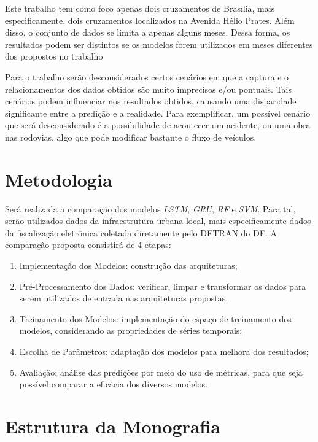 Este trabalho tem como foco apenas dois cruzamentos de Brasília, mais especificamente, dois cruzamentos localizados na Avenida Hélio Prates. Além disso, o conjunto de dados se limita a apenas alguns meses. Dessa forma, os resultados podem ser distintos se os modelos forem utilizados em meses diferentes dos propostos no trabalho

Para o trabalho serão desconsiderados certos cenários em que a captura e o relacionamentos dos dados obtidos são muito imprecisos e/ou pontuais. Tais cenários podem influenciar nos resultados obtidos, causando uma disparidade significante entre a predição e a realidade. Para exemplificar, um possível cenário que será desconsiderado é a possibilidade de acontecer um acidente, ou uma obra nas rodovias, algo que pode modificar bastante o fluxo de veículos.

\section{Metodologia}

Será realizada a comparação dos modelos  \textit{\acrshort{LSTM}}, \textit{\acrshort{GRU}}, \textit{\acrshort{RF}} e \textit{\acrshort{SVM}}. Para tal, serão utilizados dados da infraestrutura urbana local, mais especificamente dados da fiscalização eletrônica coletada diretamente pelo \acrfull{DETRAN} do \acrfull{DF}. A comparação proposta consistirá de 4 etapas:

\begin{enumerate}
    \item Implementação dos Modelos: construção das arquiteturas;
    \item Pré-Processamento dos Dados: verificar, limpar e transformar os dados para serem utilizados de entrada nas arquiteturas propostas.
    \item Treinamento dos Modelos: implementação do espaço de treinamento dos modelos, considerando as propriedades de séries temporais;
    \item Escolha de Parâmetros: adaptação dos modelos para melhora dos resultados;
    \item Avaliação: análise das predições por meio do uso de métricas, para que seja possível comparar a eficácia dos diversos modelos.
\end{enumerate}

\section{Estrutura da Monografia}

